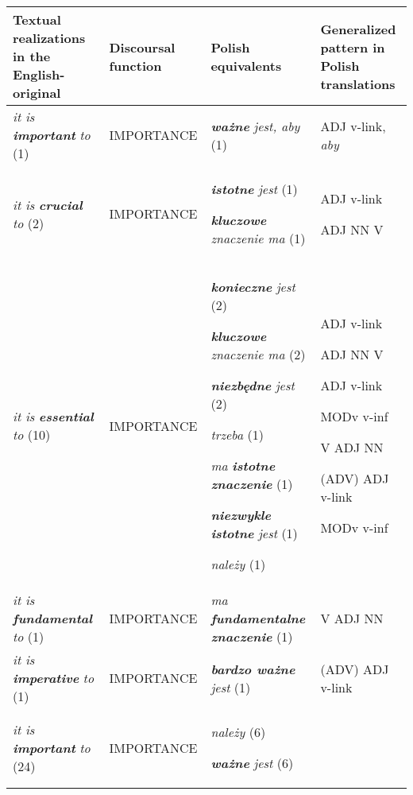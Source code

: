 \documentclass[12pt]{article}
\begin{document}
\begin{flushleft}
\tablefirsthead{}
\tablehead{}
\tabletail{}
\tablelasttail{}
\begin{supertabular}{|m{0.98095983in}|m{0.90525985in}|m{1.7920599in}|m{0.9045598in}|}
\hline
\textbf{Textual realizations in the English-original} &
\textbf{Discoursal function} &
\textbf{Polish equivalents} &
\textbf{Generalized pattern in Polish translations }\\\hline
\textit{it is }\textbf{\textit{important }}\textit{to} (1) &
IMPORTANCE &
\textbf{\textit{ważne}}\textit{ jest, aby} (1) &
ADJ v-link, \textit{aby}\\\hline
\textit{it is }\textbf{\textit{crucial}}\textit{ to} (2) &
IMPORTANCE &
\textbf{\textit{istotne}}\textit{ jest} (1)

\textbf{\textit{kluczowe}}\textit{ znaczenie ma} (1) &
ADJ v-link

ADJ NN V\\\hline
\textit{it is }\textbf{\textit{essential}}\textit{ to} (10) &
IMPORTANCE &
\textbf{\textit{konieczne }}\textit{jest} (2)

\textbf{\textit{kluczowe}}\textit{ znaczenie ma} (2)

\textbf{\textit{niezbędne}}\textit{ jest} (2)

\textit{trzeba} (1)

\textit{ma }\textbf{\textit{istotne znaczenie}}\textit{ }(1)

\textbf{\textit{niezwykle}}\textit{ }\textbf{\textit{istotne}}\textit{ jest} (1)

\textit{należy} (1) &
ADJ v-link

ADJ NN V

ADJ v-link

MODv v-inf

V ADJ NN

(ADV) ADJ v-link

MODv v-inf\\\hline
\textit{it is }\textbf{\textit{fundamental}}\textit{ to} (1) &
IMPORTANCE &
\textit{ma }\textbf{\textit{fundamentalne znaczenie}} (1) &
V ADJ NN\\\hline
\textit{it is }\textbf{\textit{imperative}}\textit{ to} (1)  &
IMPORTANCE &
\textbf{\textit{bardzo ważne}}\textit{ jest} (1) &
(ADV) ADJ v-link\\\hline
\textit{it is }\textbf{\textit{important}}\textit{ to} (24) &
IMPORTANCE &
\textit{należy} (6) 

\textbf{\textit{ważne}}\textit{ jest} (6)


\end{supertabular}
\end{flushleft}
\end{document}
